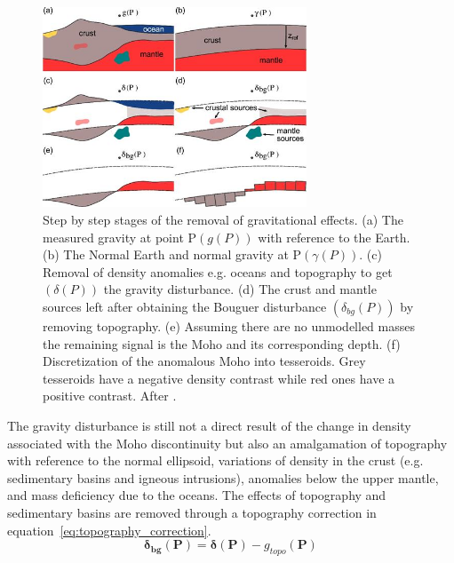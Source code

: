 \begin{figure}[h]
  \begin{center}
    \includegraphics[width=0.7\textwidth]{figures/gravity-correction}
  \end{center}
  \caption{
    Step by step stages of the removal of gravitational effects. (a) The measured gravity at point P$(g(P))$ with reference to the Earth. (b) The Normal Earth and normal gravity at P$(\gamma(P))$. (c) Removal of density anomalies e.g. oceans and topography to get $(\delta(P))$ the gravity disturbance. (d) The crust and mantle sources left after obtaining the Bouguer disturbance $(\delta_{bg}(P))$ by removing topography. (e) Assuming there are no unmodelled masses the remaining signal is the Moho and its corresponding depth. (f) Discretization of the anomalous Moho into tesseroids. Grey tesseroids have a negative density contrast while red ones have a positive contrast. After \cite{Uieda2016}.
  }
  \label{fig:gravity-correction}
\end{figure}
The gravity disturbance is still not a direct result of the change in density associated with the Moho discontinuity but also an amalgamation of topography with reference to the normal ellipsoid, variations of density in the crust (e.g. sedimentary basins and igneous intrusions), anomalies below the upper mantle, and mass deficiency due to the oceans. The effects of topography and sedimentary basins are removed through a topography correction in equation~\ref{eq:topography_correction}.
\begin{equation}
  \mathbf{\delta_{bg}}(\mathbf{P}) =
    \mathbf{\delta}(\mathbf{P}) -
    {g_{topo}}(\mathbf{P})
  \label{eq:topography_correction}
\end{equation}
